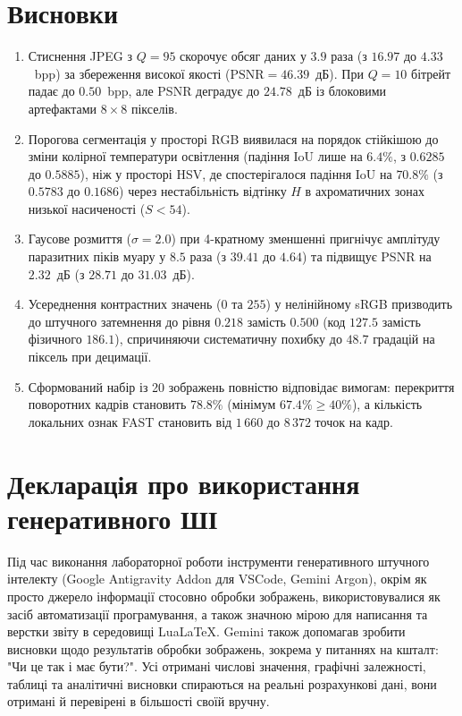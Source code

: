 \documentclass[14pt, a4paper]{extarticle}
\begin{document}
\section{Висновки}
\begin{enumerate}
    \item Стиснення JPEG з $Q=95$ скорочує обсяг даних у $3.9$ раза (з $16.97$ до $4.33$~bpp) за збереження високої якості ($\text{PSNR} = 46.39$~дБ). При $Q=10$ бітрейт падає до $0.50$~bpp, але PSNR деградує до $24.78$~дБ із блоковими артефактами $8 \times 8$ пікселів.
    \item Порогова сегментація у просторі RGB виявилася на порядок стійкішою до зміни колірної температури освітлення (падіння $\text{IoU}$ лише на $6.4\%$, з $0.6285$ до $0.5885$), ніж у просторі HSV, де спостерігалося падіння $\text{IoU}$ на $70.8\%$ (з $0.5783$ до $0.1686$) через нестабільність відтінку $H$ в ахроматичних зонах низької насиченості ($S < 54$).
    \item Гаусове розмиття ($\sigma = 2.0$) при 4-кратному зменшенні пригнічує амплітуду паразитних піків муару у $8.5$ раза (з $39.41$ до $4.64$) та підвищує PSNR на $2.32$~дБ (з $28.71$ до $31.03$~дБ).
    \item Усереднення контрастних значень ($0$ та $255$) у нелінійному sRGB призводить до штучного затемнення до рівня $0.218$ замість $0.500$ (код $127.5$ замість фізичного $186.1$), спричиняючи систематичну похибку до $48.7$ градацій на піксель при децимації.
    \item Сформований набір із 20 зображень повністю відповідає вимогам: перекриття поворотних кадрів становить $78.8\%$ (мінімум $67.4\% \ge 40\%$), а кількість локальних ознак FAST становить від $1\,660$ до $8\,372$ точок на кадр.
\end{enumerate}

\section{Декларація про використання генеративного ШІ}
Під час виконання лабораторної роботи інструменти генеративного штучного інтелекту (Google Antigravity Addon для VSCode, Gemini Argon), окрім як просто джерело інформації стосовно обробки зображень, використовувалися як засіб автоматизації програмування, а також значною мірою для написання та верстки звіту в середовищі LuaLaTeX. Gemini також допомагав зробити висновки щодо результатів обробки зображень, зокрема у питаннях на кшталт: "Чи це так і має бути?". Усі отримані числові значення, графічні залежності, таблиці та аналітичні висновки спираються на реальні розрахункові дані, вони отримані й перевірені в більшості своїй вручну.
\end{document}
